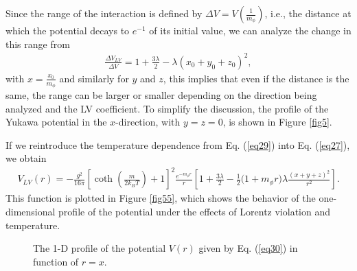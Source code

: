 \documentclass[11pt,showpacs,preprintnumbers,amsmath,amssymb,prd,nofootinbib,superscriptaddress]{revtex4-2}
\begin{document}
{Since the range of the interaction is defined by $\Delta V = V\left(\frac{1}{m_{\phi}}\right)$, i.e., the distance at which the potential decays to $e^{-1}$ of its initial value, we can analyze the change in this range from
\begin{eqnarray}
    \frac{\Delta V_{LV}}{\Delta V}=1+\frac{3\lambda}{2}-\lambda(x_0+y_0+z_0)^2,
\end{eqnarray}
with $x = \frac{x_0}{m_{\phi}}$ and similarly for $y$ and $z$, this implies that even if the distance is the same, the range can be larger or smaller depending on the direction being analyzed and the LV coefficient. To simplify the discussion, the profile of the Yukawa potential in the $x$-direction, with $y = z = 0$, is shown in Figure \ref{fig5}.

If we reintroduce the temperature dependence from Eq. (\ref{eq29}) into Eq. (\ref{eq27}), we obtain
\begin{eqnarray}
    V_{LV}(r)=-\frac{g^2}{16\pi}\left[\coth{\left(\frac{m}{2k_BT}\right)}+1\right]^2\frac{e^{-m_{\phi}r}}{r}\left[1+\frac{3\lambda}{2}-\frac{1}{2}\biggl(1+m_\phi r\biggr)\lambda\frac{(x+y+z)^2}{r^2}\right].\label{eq30}
\end{eqnarray}
This function is plotted in Figure \ref{fig55}, which shows the behavior of the one-dimensional profile of the potential under the effects of Lorentz violation and temperature.
\begin{figure}[ht]
    \centering
    \caption{The 1-D profile of the potential $V(r)$ given by Eq. (\ref{eq30}) in function of $r=x$.}
   \end{figure}

}
\end{document}
